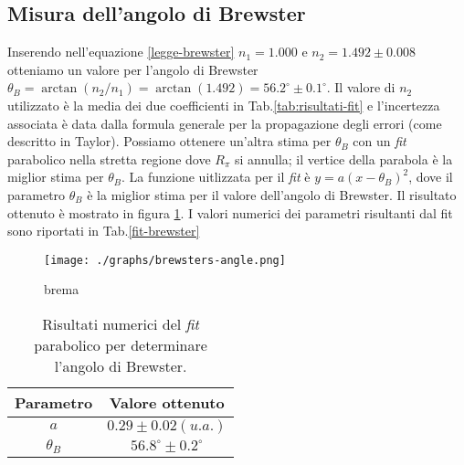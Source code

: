 \subsection{Misura dell'angolo di Brewster}\label{subsec:angolo-di-brewster}
  Inserendo nell'equazione \eqref{legge-brewster} $n_1 = 1.000$ e $n_2 = 1.492 \pm 0.008$
  otteniamo un valore per l'angolo di Brewster $\theta_B = \arctan{(n_2 / n_1)} = \arctan{(1.492)} = 56.2^\circ \pm 0.1^\circ$. Il valore di $n_2$ utilizzato è la media
  dei due coefficienti in Tab.\ref{tab:risultati-fit} e l'incertezza associata è data dalla formula generale per la
  propagazione degli errori (come descritto in Taylor\cite{taylor99}).
  Possiamo ottenere un'altra stima per $\theta_B$ con un \emph{fit} parabolico nella stretta regione
  dove $R_\pi$ si annulla; il vertice della parabola è la miglior stima per $\theta_B$.
  La funzione uitlizzata per il \emph{fit} è $y = a(x - \theta_B)^2$, dove il parametro $\theta_B$ è la
  miglior stima per il valore dell'angolo di Brewster.
  Il risultato ottenuto è mostrato in figura \ref{fig:brewsters-angle}. I valori numerici
  dei parametri risultanti dal fit sono riportati in Tab.\ref{fit-brewster}
  \begin{figure}[h]
    \centering
    \caption{brema}
    \texttt{[image: ./graphs/brewsters-angle.png]}
    \label{fig:brewsters-angle}
  \end{figure}
  \begin{table}[ht]
    \centering
    \caption{
      Risultati numerici del \emph{fit} parabolico per determinare l'angolo di Brewster.
    }
    \begin{tabular}[t]{cc}
      \toprule
      Parametro &Valore ottenuto\\
      \midrule
      $a$ &$0.29 \pm 0.02 (u.a.)$ \\
      $\theta_B$ &$56.8^\circ \pm 0.2^\circ$ \\
      \bottomrule
    \end{tabular}\label{tab:fit-brewster}
  \end{table}
\endinput



